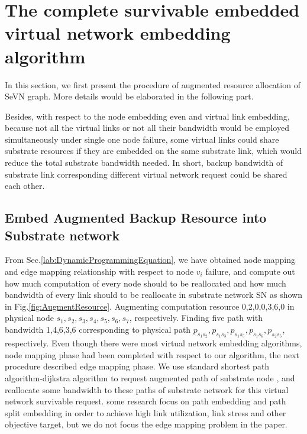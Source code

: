 \section{The complete survivable embedded virtual network embedding algorithm}
In this section, we first present the procedure of augmented resource allocation  of SeVN graph.
More details would be elaborated in the following part.

Besides, with respect to the node embedding even and virtual link embedding, because not all the virtual links or not all their bandwidth would be employed simultaneously under single one node failure, some virtual links could share substrate resources if they are embedded on the same substrate link, which would reduce the total substrate bandwidth needed. In short, backup bandwidth of substrate link corresponding different virtual network request could be shared each other.


\subsection{Embed Augmented Backup Resource into Substrate network}
From Sec.\ref{lab:DynamicProgrammingEquation}, we have obtained node mapping and edge mapping relationship with respect to node $v_i$ failure, and compute out how much computation of every node should to be reallocated  and how much bandwidth of every link should to be reallocate  in substrate network SN as shown in Fig.\ref{fig:AugmentResource}. Augmenting computation resource 0,2,0,0,3,6,0 in physical node $s_1,s_2,s_3,s_4,s_5,s_6,s_7$, respectively. Finding five path with bandwidth 1,4,6,3,6 corresponding to physical path $p_{s_1s_2},p_{s_1s_3},p_{s_1s_5},p_{s_1s_6},p_{s_2s_5}$, respectively. Even though there were most virtual network embedding algorithms, node mapping phase had been completed with respect to our algorithm, the next procedure described edge mapping phase. We use standard shortest path algorithm-dijkstra algorithm\cite{skiena1990dijkstra} to request augmented path of substrate node , and reallocate some bandwidth to these paths of substrate network for this virtual network survivable request. some research\cite{yu2008rethinking} focus on path embedding and path split embedding in order to achieve high link utilization, link stress and other objective target, but we do not focus the edge mapping problem in the paper.


